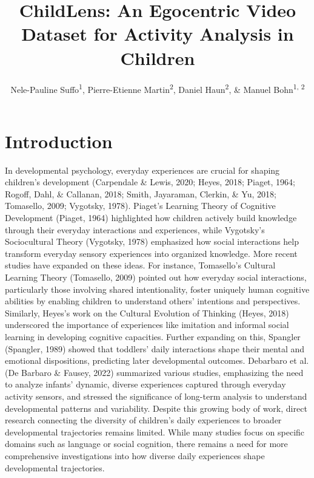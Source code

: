 \documentclass[
  man,floatsintext]{apa6}
\title{ChildLens: An Egocentric Video Dataset for Activity Analysis in Children}
\author{Nele-Pauline Suffo\textsuperscript{1}, Pierre-Etienne Martin\textsuperscript{2}, Daniel Haun\textsuperscript{2}, \& Manuel Bohn\textsuperscript{1, 2}}
\date{}
\affiliation{\vspace{0.5cm}\textsuperscript{1} Institute of Psychology in Education, Leuphana University Lüneburg\\\textsuperscript{2} Max Planck Institute for Evolutionary Anthropology}
\begin{document}
\maketitle

\section{Introduction}\label{introduction}

In developmental psychology, everyday experiences are crucial for shaping children's development (Carpendale \& Lewis, 2020; Heyes, 2018; Piaget, 1964; Rogoff, Dahl, \& Callanan, 2018; Smith, Jayaraman, Clerkin, \& Yu, 2018; Tomasello, 2009; Vygotsky, 1978). Piaget's Learning Theory of Cognitive Development (Piaget, 1964) highlighted how children actively build knowledge through their everyday interactions and experiences, while Vygotsky's Sociocultural Theory (Vygotsky, 1978) emphasized how social interactions help transform everyday sensory experiences into organized knowledge. More recent studies have expanded on these ideas. For instance, Tomasello's Cultural Learning Theory (Tomasello, 2009) pointed out how everyday social interactions, particularly those involving shared intentionality, foster uniquely human cognitive abilities by enabling children to understand others' intentions and perspectives. Similarly, Heyes's work on the Cultural Evolution of Thinking (Heyes, 2018) underscored the importance of experiences like imitation and informal social learning in developing cognitive capacities. Further expanding on this, Spangler (Spangler, 1989) showed that toddlers' daily interactions shape their mental and emotional dispositions, predicting later developmental outcomes. Debarbaro et al. (De Barbaro \& Fausey, 2022) summarized various studies, emphasizing the need to analyze infants' dynamic, diverse experiences captured through everyday activity sensors, and stressed the significance of long-term analysis to understand developmental patterns and variability. Despite this growing body of work, direct research connecting the diversity of children's daily experiences to broader developmental trajectories remains limited. While many studies focus on specific domains such as language or social cognition, there remains a need for more comprehensive investigations into how diverse daily experiences shape developmental trajectories.
\end{document}
